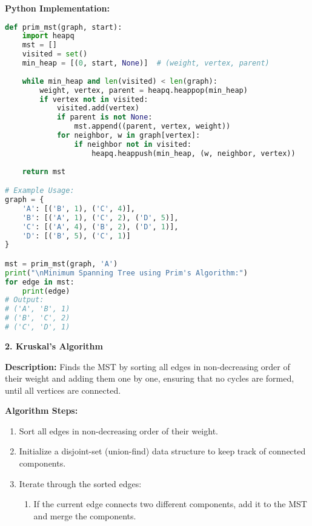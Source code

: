 \textbf{Python Implementation:}

\begin{lstlisting}[language=Python, xleftmargin=0.02\textwidth, xrightmargin=0.02\textwidth]
def prim_mst(graph, start):
    import heapq
    mst = []
    visited = set()
    min_heap = [(0, start, None)]  # (weight, vertex, parent)
    
    while min_heap and len(visited) < len(graph):
        weight, vertex, parent = heapq.heappop(min_heap)
        if vertex not in visited:
            visited.add(vertex)
            if parent is not None:
                mst.append((parent, vertex, weight))
            for neighbor, w in graph[vertex]:
                if neighbor not in visited:
                    heapq.heappush(min_heap, (w, neighbor, vertex))
    
    return mst

# Example Usage:
graph = {
    'A': [('B', 1), ('C', 4)],
    'B': [('A', 1), ('C', 2), ('D', 5)],
    'C': [('A', 4), ('B', 2), ('D', 1)],
    'D': [('B', 5), ('C', 1)]
}

mst = prim_mst(graph, 'A')
print("\nMinimum Spanning Tree using Prim's Algorithm:")
for edge in mst:
    print(edge)
# Output:
# ('A', 'B', 1)
# ('B', 'C', 2)
# ('C', 'D', 1)
\end{lstlisting}

\textbf{2. Kruskal's Algorithm}

\textbf{Description:}  
Finds the MST by sorting all edges in non-decreasing order of their weight and adding them one by one, ensuring that no cycles are formed, until all vertices are connected.

\textbf{Algorithm Steps:}
\begin{enumerate}
    \item Sort all edges in non-decreasing order of their weight.
    \item Initialize a disjoint-set (union-find) data structure to keep track of connected components.
    \item Iterate through the sorted edges:
    \begin{enumerate}
        \item If the current edge connects two different components, add it to the MST and merge the components.
    \end{enumerate}
\end{enumerate}

